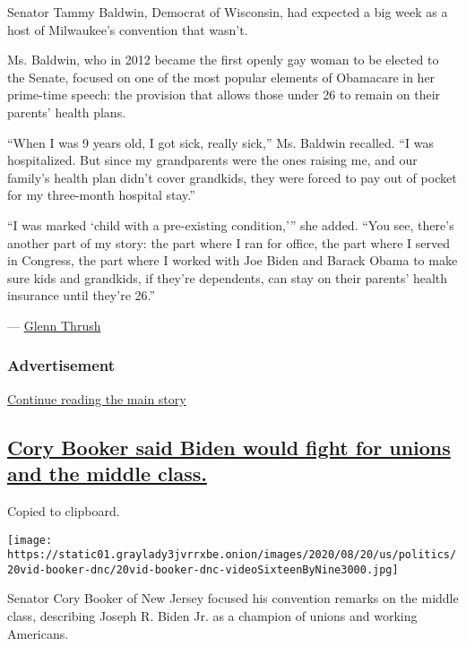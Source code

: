 Senator Tammy Baldwin, Democrat of Wisconsin, had expected a big week as
a host of Milwaukee's convention that wasn't.

Ms. Baldwin, who in 2012 became the first openly gay woman to be elected
to the Senate, focused on one of the most popular elements of Obamacare
in her prime-time speech: the provision that allows those under 26 to
remain on their parents' health plans.

``When I was 9 years old, I got sick, really sick,'' Ms. Baldwin
recalled. ``I was hospitalized. But since my grandparents were the ones
raising me, and our family's health plan didn't cover grandkids, they
were forced to pay out of pocket for my three-month hospital stay.''

``I was marked `child with a pre-existing condition,''' she added. ``You
see, there's another part of my story: the part where I ran for office,
the part where I served in Congress, the part where I worked with Joe
Biden and Barack Obama to make sure kids and grandkids, if they're
dependents, can stay on their parents' health insurance until they're
26.''

--- \href{https://www.nytimes3xbfgragh.onion/by/glenn-thrush}{Glenn
Thrush}

\hypertarget{advertisement-3}{%
\subsubsection{Advertisement}\label{advertisement-3}}

\protect\hyperlink{after-dfp-ad-mid4}{Continue reading the main story}

\hypertarget{cory-booker-said-biden-would-fight-for-unions-and-the-middle-class}{%
\subsection{\texorpdfstring{\protect\hyperlink{cory-booker-said-biden-would-fight-for-unions-and-the-middle-class}{Cory
Booker said Biden would fight for unions and the middle
class.}}{Cory Booker said Biden would fight for unions and the middle class.}}\label{cory-booker-said-biden-would-fight-for-unions-and-the-middle-class}}

Copied to clipboard.

\texttt{[image: https://static01.graylady3jvrrxbe.onion/images/2020/08/20/us/politics/20vid-booker-dnc/20vid-booker-dnc-videoSixteenByNine3000.jpg]}

Senator Cory Booker of New Jersey focused his convention remarks on the
middle class, describing Joseph R. Biden Jr. as a champion of unions and
working Americans.

